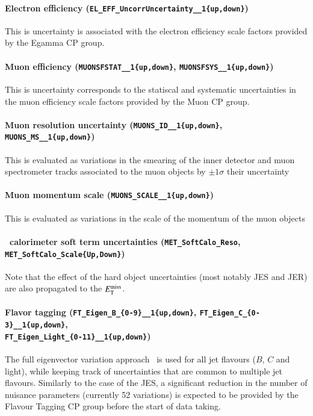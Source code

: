 \paragraph{Electron efficiency ({\tt{EL\_EFF\_UncorrUncertainty\_\_1\{up,down\}}})} 
This is uncertainty is associated with the electron efficiency scale factors provided by the Egamma CP group.

\paragraph{Muon efficiency ({\tt{MUONSFSTAT\_\_1\{up,down\}}}, {\tt{MUONSFSYS\_\_1\{up,down\}}})}
This is uncertainty corresponds to the statiscal and systematic uncertainties in the muon efficiency scale factors provided by the Muon CP group.

\paragraph{Muon resolution uncertainty  ({\tt{MUONS\_ID\_\_1\{up,down\}}}, {\tt{MUONS\_MS\_\_1\{up,down\}}})} 
This is evaluated as variations in the smearing of the inner detector and muon spectrometer tracks associated to the muon objects by $\pm 1\sigma$ their uncertainty

\paragraph{Muon momentum scale ({\tt{MUONS\_SCALE\_\_1\{up,down\}}})} 
This is evaluated as variations in the scale of the momentum of the muon objects

\paragraph{\met\ calorimeter soft term uncertainties  ({\tt{MET\_SoftCalo\_Reso}}, {\tt{MET\_SoftCalo\_Scale\{Up,Down\}}})}
Note that the effect of the hard object uncertainties (most notably JES and JER) are also propagated to the $E_{\mathrm{T}}^{\mathrm{miss}}$.

\paragraph{Flavor tagging ({\tt{FT\_Eigen\_B\_\{0-9\}\_\_1\{up,down\}}}, {\tt{FT\_Eigen\_C\_\{0-3\}\_\_1\{up,down\}}},\\ {\tt{FT\_Eigen\_Light\_\{0-11\}\_\_1\{up,down\}}})} 
The full eigenvector variation approach~\cite{flavTagg} is used for all jet flavours ($B$, $C$ and light), while keeping track of uncertainties that are common to multiple jet flavours. Similarly to the case of the JES, a significant reduction in the number of nuisance parameters (currently 52 variations) is expected to be provided by the Flavour Tagging CP group before the start of data taking.\\

